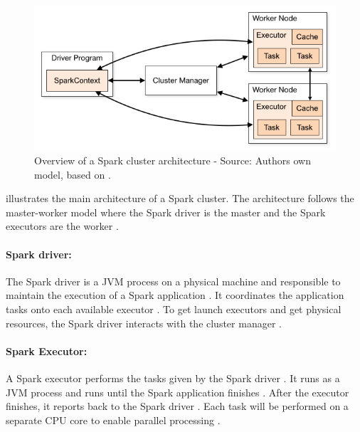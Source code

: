 \begin{figure}[h]%
\centering
\includegraphics[scale=0.5]{images/04_technical_background/cluster_overview}%
\caption{Overview of a Spark cluster architecture - Source: Authors own model, based on \cite{Apache2020Spark}.}%
\label{fig:spark_cluster_overview}%
\end{figure}

 illustrates the main architecture of a Spark cluster. The architecture follows the master-worker model where the Spark driver is the master and the Spark executors are the worker \cite{Hien2018Spark}.

\paragraph{Spark driver:}
The Spark driver is a JVM process on a physical machine and responsible to maintain the execution of a Spark application \cite{Chambers2018Spark}. It coordinates the application tasks onto each available executor \cite{Hien2018Spark}. To get launch executors and get physical resources, the Spark driver interacts with the cluster manager \cite{Chambers2018Spark, Hien2018Spark}.


\paragraph{Spark Executor:}
A Spark executor performs the tasks given by the Spark driver \cite{Chambers2018Spark}. It runs as a JVM process and runs until the Spark application finishes \cite{Hien2018Spark}. After the executor finishes, it reports back to the Spark driver \cite{Chambers2018Spark}. Each task will be performed on a separate CPU core to enable parallel processing  \cite{Hien2018Spark}.


